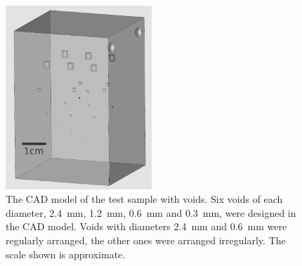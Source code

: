 \documentclass{article}
\begin{document}
\begin{figure}[h]
  \centering
  \includegraphics[width=0.49\textwidth]{../figures/inference/TestObjectBW.png}
  \caption{The CAD model of the test sample with voids. Six voids of each diameter, \SI{2.4}{\milli\metre}, \SI{1.2}{\milli\metre}, \SI{0.6}{\milli\metre} and \SI{0.3}{\milli\metre}, were designed in the CAD model. Voids with diameters \SI{2.4}{\milli\metre} and \SI{0.6}{\milli\metre} were regularly arranged, the other ones were arranged irregularly. The scale shown is approximate.}
  \label{fig:inference_testObject}
\end{figure}

\clearpage
\end{document}
